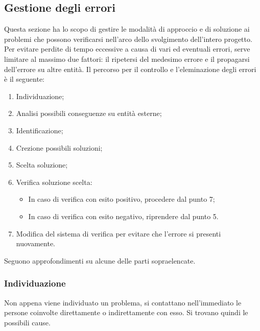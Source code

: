 \subsection{Gestione degli errori}
Questa sezione ha lo scopo di gestire le modalità di approccio e di soluzione ai problemi 
che possono verificarsi nell'arco dello svolgimento dell'intero progetto.
Per evitare perdite di tempo eccessive a causa di vari ed eventuali errori, serve limitare 
al massimo due fattori: il ripetersi del medesimo errore e il propagarsi dell'errore su altre 
entità. \newline
Il percorso per il controllo e l'eleminazione degli errori è il seguente:
\begin{enumerate}
    \item Individuazione;
    \item Analisi possibili conseguenze su entità esterne;
    \item Identificazione;
    \item Crezione possibili soluzioni;
    \item Scelta soluzione;
    \item Verifica soluzione scelta:
    \begin{itemize}
        \item In caso di verifica con esito positivo, procedere dal punto 7;
        \item In caso di verifica con esito negativo, riprendere dal punto 5.
    \end{itemize}
    \item Modifica del sistema di verifica per evitare che l'errore si presenti nuovamente.
\end{enumerate}
Seguono approfondimenti su alcune delle parti sopraelencate. 
\subsubsection{Individuazione}
Non appena viene individuato un problema, si contattano nell'immediato le persone coinvolte direttamente o 
indirettamente con esso. Si trovano quindi le possibili cause.
